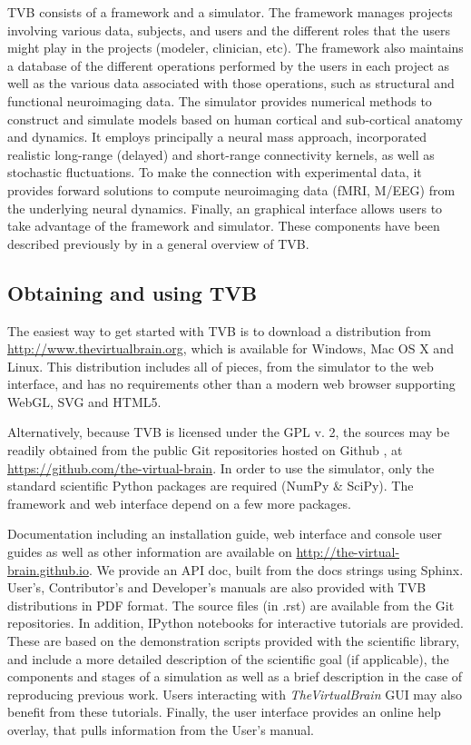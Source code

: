 \documentclass{bioinfo}
\newcommand{\TVB}{\textit{TheVirtualBrain }}
\begin{document}
TVB consists of a framework and a simulator. 
The framework manages projects involving various data, subjects, and users
and the different roles that the users might play in the projects (modeler, 
clinician, etc). The framework also maintains a database of the different
operations performed by the users in each project as well as the various
data associated with those operations, such as structural and functional
neuroimaging data.
The simulator provides numerical methods to construct and simulate models
based on human cortical and sub-cortical anatomy and dynamics. It employs principally
a neural mass approach, incorporated realistic long-range (delayed) and
short-range connectivity kernels, as well as stochastic fluctuations. 
To make the connection with experimental data, it provides forward solutions to
compute neuroimaging data (fMRI, M/EEG) from the underlying neural dynamics. 
Finally, an graphical interface allows users to take advantage of the framework
and simulator. These components have been described previously by 
\citeauthor{Sanz-Leon_2013} \citeyear{Sanz-Leon_2013} in a general overview
of TVB.

\subsection{Obtaining and using TVB}

The easiest way to get started with TVB is to download a distribution
from \url{http://www.thevirtualbrain.org}, which is available for Windows,
Mac OS X and Linux. This distribution includes
all of pieces, from the simulator to the web interface, and has no
requirements other than a modern web browser supporting WebGL, SVG and
HTML5.

Alternatively, because TVB is licensed under the GPL v. 2, the sources may be
readily obtained from the public Git repositories hosted on Github
\citep{dabbish2012social}, at 
\url{https://github.com/the-virtual-brain}. In order to use the simulator, 
only the standard scientific Python packages are required (NumPy \& SciPy).
The framework and web interface depend on a few more packages. 

Documentation including an installation guide, web interface and console 
user guides as well as other information are available on 
\url{http://the-virtual-brain.github.io}.
We provide an API doc, built from the docs strings using Sphinx.
User's, Contributor's and Developer's manuals are also provided with TVB
distributions in PDF format. The source files (in .rst) are available
from the Git repositories.
In addition, IPython notebooks \citep{PerezGranger_2007}
for interactive tutorials are provided. These are based on the
demonstration scripts provided with the scientific library, and
include a more detailed description of the scientific goal (if
applicable), the components and stages of a simulation as well as a
brief description in the case of reproducing previous work. Users
interacting with \TVB GUI may also benefit from these tutorials.
Finally, the user interface provides an online help overlay, that pulls
information from the User's manual.
\end{document}
